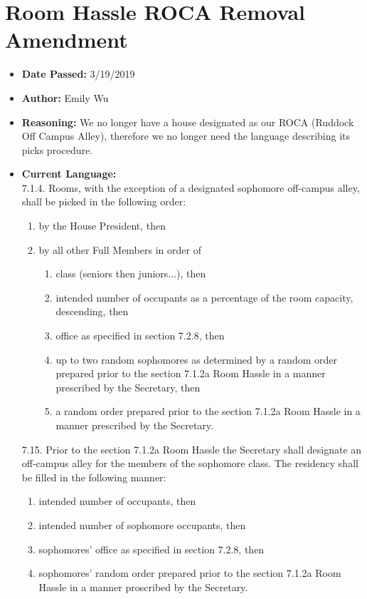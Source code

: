 \documentclass[10pt]{article} %
\begin{document}
\section{Room Hassle ROCA Removal Amendment}
\begin{itemize}
	\item \textbf{Date Passed:} 3/19/2019
	\item \textbf{Author:} Emily Wu
	\item \textbf{Reasoning:} We no longer have a house designated as our ROCA (Ruddock Off Campus Alley), therefore we no longer need the language describing its picks procedure.  
	\item \textbf{Current Language:} \\
	7.1.4. Rooms, with the exception of a designated sophomore off-campus alley, shall be picked in the following order: 
	\begin{enumerate}[label=(\alph*)]
		\item by the House President, then 
		\item by all other Full Members in order of 
		\begin{enumerate}[label=(\roman*)]
			\item class (seniors then juniors...), then 
			\item intended number of occupants as a percentage of the room capacity, descending, then 
			\item office as specified in section 7.2.8, then 
			\item up to two random sophomores as determined by a random order prepared prior to the section 7.1.2a Room Hassle in a manner prescribed by the Secretary, then 
			\item a random order prepared prior to the section 7.1.2a Room Hassle in a manner prescribed by the Secretary.
		\end{enumerate}
	\end{enumerate}
	
	7.15. Prior to the section 7.1.2a Room Hassle the Secretary shall designate an off-campus alley for the members of the sophomore class. The residency shall be filled in the following manner: 
	\begin{enumerate}[label=(\alph*)]
		\item intended number of occupants, then 
		\item intended number of sophomore occupants, then 
		\item sophomores’ office as specified in section 7.2.8, then 
		\item sophomores’ random order prepared prior to the section 7.1.2a Room Hassle in a manner proscribed by the Secretary. 
	\end{enumerate}
	

\end{itemize}
\end{document}
